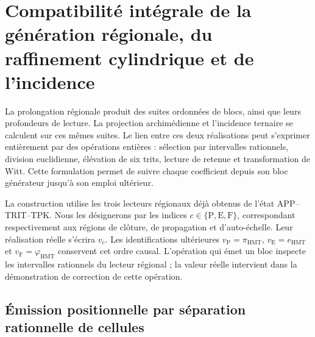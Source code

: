 
\section[Génération régionale et raffinement]{Compatibilité intégrale de la génération régionale, du raffinement cylindrique et de l'incidence}
\label{sec:df-lectores-cilindros}

La prolongation régionale produit des suites ordonnées de blocs, ainsi que
leurs profondeurs de lecture. La projection archimédienne et l'incidence
ternaire se calculent sur ces mêmes suites. Le lien entre ces deux
réalisations peut s'exprimer entièrement par des opérations entières :
sélection par intervalles rationnels, division euclidienne, élévation de six
trits, lecture de retenue et transformation de Witt. Cette formulation permet
de suivre chaque coefficient depuis son bloc générateur jusqu'à son emploi ultérieur.

La construction utilise les trois lecteurs régionaux déjà obtenus de l'état APP--TRIT--TPK. Nous les désignerons par les indices \(c\in\{\mathrm P,\mathrm E,\mathrm F\}\), correspondant respectivement aux régions de clôture, de propagation et d'auto-échelle. Leur réalisation réelle s'écrira \(v_c\). Les identifications ultérieures \(v_{\mathrm P}=\pi_{\mathrm{HMT}}\), \(v_{\mathrm E}=e_{\mathrm{HMT}}\) et \(v_{\mathrm F}=\varphi_{\mathrm{HMT}}\) conservent cet ordre causal. L'opération qui émet un bloc inspecte les intervalles rationnels du lecteur régional ; la valeur réelle intervient dans la démonstration de correction de cette opération.

\subsection{Émission positionnelle par séparation rationnelle de cellules}
\label{subsec:df-emision-racional}


